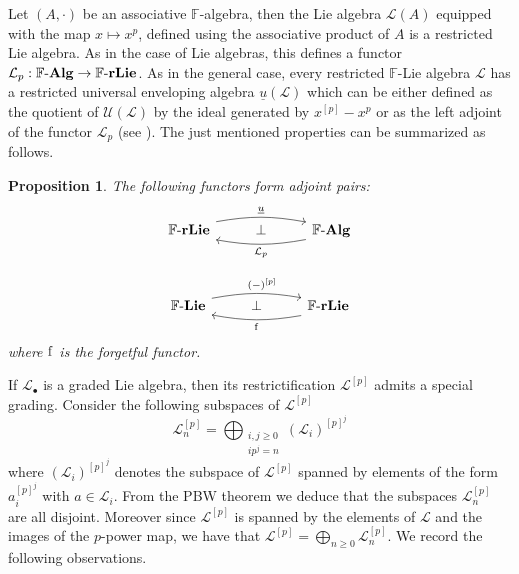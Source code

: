 \documentclass{amsart}
\theoremstyle{plain}
\newtheorem{prop}{Proposition}
\theoremstyle{definition}
\numberwithin{theorem}{section}
\numberwithin{equation}{section}
\newcommand{\LL}{\mathscr{L}}
\newcommand{\Univ}{\mathscr{U}}
\newcommand{\rUniv}{\underline{{u}}}
\newcommand{\catlie}{\mathbf{Lie}}
\newcommand{\catReslie}{\mathbf{rLie}}
\newcommand{\catAlg}{\mathbf{Alg}}
\newcommand{\FF}{\mathbb{F}}
\begin{document}
Let $(A, \cdot)$ be an associative $\FF$-algebra, then the Lie algebra ${\mathcal L}(A)$ equipped with the map $x \mapsto x^p$, defined using the associative product of $A$ is a restricted Lie algebra. As in the case of Lie algebras, this defines a functor ${\mathcal L}_p : \FF\text-\catAlg \to \FF\text-\catReslie$. As in the general case, every restricted $\FF$-Lie algebra $\LL$ has a restricted universal enveloping algebra $\rUniv(\LL)$ which can be either defined as the quotient of $\Univ(\LL)$ by the ideal generated by $x^{[p]}-x^p$ or as the left adjoint of the functor ${\mathcal L}_p$ (see \cite{Jac37}).
The just mentioned properties can be summarized as follows.
\begin{prop}\label{prop:adj.restrictification}
    	The following functors form adjoint pairs:
	\begin{equation}\begin{tikzcd}
        \FF\text-\catReslie \arrow[rr, yshift=3pt, bend left=10pt, "\rUniv"] & {\bot} & \FF\text-\catAlg \arrow[ll, yshift=-3pt, bend left=10pt, "{\mathcal L}_p" below]
    \end{tikzcd}\end{equation}

	\begin{equation}\label{eq:adj.restr}\begin{tikzcd}
        \FF\text-\catlie \arrow[rr, yshift=3pt, bend left=10pt, "(-)^{[p]}" xshift=4pt] & {\bot} & \FF\text-\catReslie \arrow[ll, yshift=-3pt, bend left=10pt, "\rm f" below]
    \end{tikzcd}\end{equation}
	where $\rm f$ is the forgetful functor.
\end{prop} 

\noindent
If $\LL_\bullet$ is a graded Lie algebra, then its restrictification $\LL^{[p]}$ admits a special grading. Consider the following subspaces of $\LL^{[p]}$ 
\begin{equation}\label{eq:pbw.restrictification}
	\LL^{[p]}_n = \bigoplus_{\substack{i, j \geq 0 \\ ip^j = n}} (\LL_i)^{[p]^j}
\end{equation}
where $(\LL_i)^{[p]^j}$ denotes the subspace of $\LL^{[p]}$ spanned by elements of the form $a_i^{[p]^j}$ with $a \in \LL_i$. From the PBW theorem we deduce that the subspaces $\LL^{[p]}_n$ are all disjoint. Moreover since $\LL^{[p]}$ is spanned by the elements of $\LL$ and the images of the $p$-power map, we have that $\LL^{[p]} = \bigoplus_{n \geq 0} \LL_n^{[p]}$.
\noindent
We record the following observations.
\end{document}
